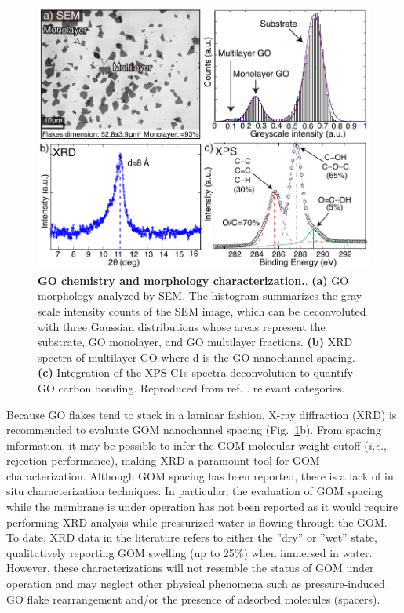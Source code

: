 \begin{figure}[h!]
  \centering
  \includegraphics[width=5in]{paper2/Fig3.pdf}
  \caption{\textbf{GO chemistry and morphology characterization.}. \textbf{(a)} GO morphology analyzed by SEM. The histogram summarizes the gray scale intensity counts of the SEM image, which can be deconvoluted with three Gaussian distributions whose areas represent the substrate, GO monolayer, and GO multilayer fractions. \textbf{(b)} XRD spectra of multilayer GO where d is the GO nanochannel spacing. \textbf{(c)} Integration of the XPS C1s spectra deconvolution to quantify GO carbon bonding. Reproduced from ref. \cite{amadei2016fabrication}.
 relevant categories.}
  \label{Fig3_pap2}
\end{figure}
Because GO flakes tend to stack in a laminar fashion, X-ray diffraction (XRD) is recommended to evaluate GOM nanochannel spacing (Fig.~\ref{Fig3_pap2}b). From spacing information, it may be possible to infer the GOM molecular weight cutoff (\textit{i.e.}, rejection performance), making XRD a paramount tool for GOM characterization. Although GOM spacing has been reported,\cite{xia2015ultrathin,talyzin2014structure} there is a lack of in situ characterization techniques. In particular, the evaluation of GOM spacing while the membrane is under operation has not been reported as it would require performing XRD analysis while pressurized water is flowing through the GOM. To date, XRD data in the literature refers to either the ''dry'' or ''wet'' state, qualitatively reporting GOM swelling (up to 25\%) when immersed in water.\cite{talyzin2014structure} However, these characterizations will not resemble the status of GOM under operation and may neglect other physical phenomena such as pressure-induced GO flake rearrangement and/or the presence of adsorbed molecules (spacers).\\
